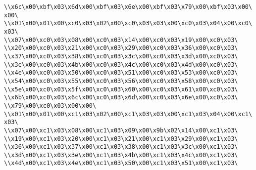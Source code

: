 \verb|\\x6c\x00\xbf\x03\x6d\x00\xbf\x03\x6e\x00\xbf\x03\x79\x00\xbf\x03\x00\x00\|\newline
\verb|\\x01\x00\x01\x00\xc0\x03\x02\x00\xc0\x03\x03\x00\xc0\x03\x04\x00\xc0\x03\|\newline
\verb|\\x07\x00\xc0\x03\x08\x00\xc0\x03\x14\x00\xc0\x03\x19\x00\xc0\x03\|\newline
\verb|\\x20\x00\xc0\x03\x21\x00\xc0\x03\x29\x00\xc0\x03\x36\x00\xc0\x03\|\newline
\verb|\\x37\x00\xc0\x03\x38\x00\xc0\x03\x3c\x00\xc0\x03\x3d\x00\xc0\x03\|\newline
\verb|\\x3e\x00\xc0\x03\x4b\x00\xc0\x03\x4c\x00\xc0\x03\x4d\x00\xc0\x03\|\newline
\verb|\\x4e\x00\xc0\x03\x50\x00\xc0\x03\x51\x00\xc0\x03\x53\x00\xc0\x03\|\newline
\verb|\\x54\x00\xc0\x03\x55\x00\xc0\x03\x56\x00\xc0\x03\x58\x00\xc0\x03\|\newline
\verb|\\x5e\x00\xc0\x03\x5f\x00\xc0\x03\x60\x00\xc0\x03\x61\x00\xc0\x03\|\newline
\verb|\\x6b\x00\xc0\x03\x6c\x00\xc0\x03\x6d\x00\xc0\x03\x6e\x00\xc0\x03\|\newline
\verb|\\x79\x00\xc0\x03\x00\x00\|\newline
\verb|\\x01\x00\x01\x00\xc1\x03\x02\x00\xc1\x03\x03\x00\xc1\x03\x04\x00\xc1\x03\|\newline
\verb|\\x07\x00\xc1\x03\x08\x00\xc1\x03\x09\x00\x9b\x02\x14\x00\xc1\x03\|\newline
\verb|\\x19\x00\xc1\x03\x20\x00\xc1\x03\x21\x00\xc1\x03\x29\x00\xc1\x03\|\newline
\verb|\\x36\x00\xc1\x03\x37\x00\xc1\x03\x38\x00\xc1\x03\x3c\x00\xc1\x03\|\newline
\verb|\\x3d\x00\xc1\x03\x3e\x00\xc1\x03\x4b\x00\xc1\x03\x4c\x00\xc1\x03\|\newline
\verb|\\x4d\x00\xc1\x03\x4e\x00\xc1\x03\x50\x00\xc1\x03\x51\x00\xc1\x03\|\newline
